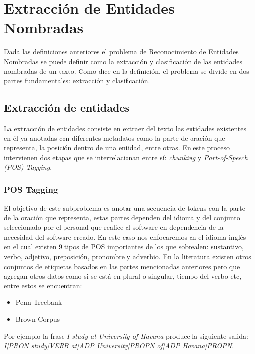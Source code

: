 \documentclass[runningheads]{llncs}
\begin{document}
\section{Extracción de Entidades Nombradas}

Dada las definiciones anteriores el problema de Reconocimiento de Entidades Nombradas se puede definir como la extracción y clasificación de las entidades nombradas de un texto. Como dice en la definición, el problema se divide en dos partes fundamentales: extracción y clasificación.

\subsection{Extracción de entidades}

La extracción de entidades consiste en extraer del texto las entidades existentes en él ya anotadas con diferentes metadatos como la parte de oración que representa, la posición dentro de una entidad, entre otras. En este proceso intervienen dos etapas que se interrelacionan entre sí: \emph{chunking}\cite{chunking} y \emph{Part-of-Speech (POS) Tagging}\cite{postag}.

\subsubsection{POS Tagging}

El objetivo de este subproblema es anotar una secuencia de tokens con la parte de la oración que representa, estas partes dependen del idioma y del conjunto seleccionado por el personal que realice el software en dependencia de la necesidad del software creado. En este caso nos enfocaremos en el idioma inglés en el cual existen 9 tipos de POS importantes de los que sobrealen: sustantivo, verbo, adjetivo, preposición, pronombre y adverbio. En la literatura existen otros conjuntos de etiquetas basados en las partes mencionadas anteriores pero que agregan otros datos como si se está en plural o singular, tiempo del verbo etc, entre estos se encuentran:

\begin{itemize}
\item Penn Treebank \cite{pennpostag}
\item Brown Corpus \cite{brownpostag}
\end{itemize}

Por ejemplo la frase \emph{I study at University of Havana} produce la siguiente salida: \emph{I|PRON study|VERB at|ADP University|PROPN of|ADP Havana|PROPN}.
\end{document}
